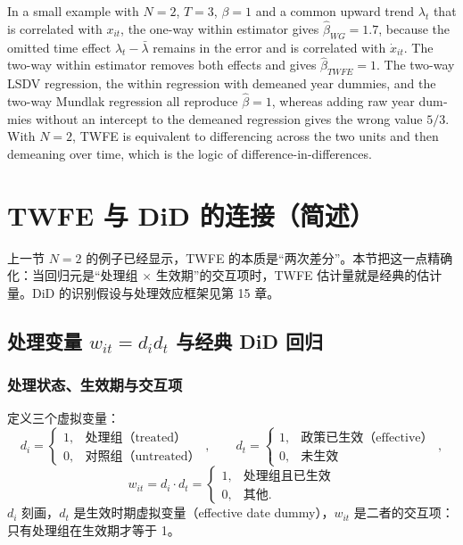 \begin{english}
In a small example with $N=2$, $T=3$, $\beta=1$ and a common upward trend $\lambda_t$ that is correlated with $x_{it}$, the one-way within estimator gives $\hat\beta_{WG}=1.7$, because the omitted time effect $\lambda_t-\bar\lambda$ remains in the error and is correlated with $\dot x_{it}$. The two-way within estimator removes both effects and gives $\hat\beta_{TWFE}=1$. The two-way LSDV regression, the within regression with demeaned year dummies, and the two-way Mundlak regression all reproduce $\hat\beta=1$, whereas adding raw year dummies without an intercept to the demeaned regression gives the wrong value $5/3$. With $N=2$, TWFE is equivalent to differencing across the two units and then demeaning over time, which is the logic of difference-in-differences.
\end{english}

\section{TWFE 与 DiD 的连接（简述）}\label{sec:U10b-did}

上一节 $N=2$ 的例子已经显示，TWFE 的本质是“两次差分”。本节把这一点精确化：当回归元是“处理组 $\times$ 生效期”的交互项时，TWFE 估计量就是经典的估计量。DiD 的识别假设与处理效应框架见第 15 章。

\subsection{处理变量 \texorpdfstring{$w_{it}=d_id_t$}{w = d\_i d\_t} 与经典 DiD 回归}

\subsubsection{处理状态、生效期与交互项}

定义三个虚拟变量：
\[
d_i=\begin{cases}1,&\text{处理组（treated）}\\0,&\text{对照组（untreated）}\end{cases},\qquad
d_t=\begin{cases}1,&\text{政策已生效（effective）}\\0,&\text{未生效}\end{cases},
\]
\[
w_{it}=d_i\cdot d_t=\begin{cases}1,&\text{处理组且已生效}\\0,&\text{其他}.\end{cases}
\]
$d_i$ 刻画，$d_t$ 是生效时期虚拟变量（effective date dummy），$w_{it}$ 是二者的交互项：只有处理组在生效期才等于 1。


